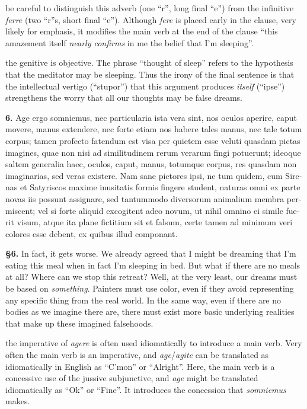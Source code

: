 be careful to distinguish this adverb (one ``r'', long final ``e'') from the infinitive \textit{ferre} (two ``r''s, short final ``e''). Although \textit{fere} is placed early in the clause, very likely for emphasis, it modifies the main verb at the end of the clause ``this amazement itself \textit{nearly confirms} in me the belief that I'm sleeping''.

 the genitive is objective. The phrase ``thought of sleep'' refers to the hypothesis that the meditator may be sleeping. Thus the irony of the final sentence is that the intellectual vertigo (``stupor'') that this argument produces \textit{itself} (``ipse'') strengthens the worry that all our thoughts may be false dreams.

\clearpage

\beginnumbering
\pstart
\begin{latin}
\textenglish{\textbf{6.}} Age ergo somniemus, nec particularia ista vera sint, nos oculos aperire, caput movere, manus extendere, nec forte etiam nos habere tales manus, nec tale totum corpus; tamen profecto fatendum est visa per quietem esse veluti quasdam pictas imagines, quae non nisi ad similitudinem rerum verarum fingi potuerunt; ideoque saltem generalia haec, oculos, caput, manus, totumque corpus, res quasdam non imaginarias, sed veras existere. Nam sane pictores ipsi, ne tum quidem, cum Sirenas et Satyriscos maxime inusitatis formis fingere student, naturas omni ex parte novas iis possunt assignare, sed tantummodo diversorum animalium membra permiscent; vel si forte aliquid excogitent adeo novum, ut nihil omnino ei simile fuerit visum, atque ita plane fictitium sit et falsum, certe tamen ad minimum veri colores esse debent, ex quibus illud componant.
\end{latin}
\pend
\endnumbering

\prenotes

\textbf{§6.} In fact, it gets worse. We already agreed that I might be dreaming that I'm eating this meal when in fact I'm sleeping in bed. But what if there are no meals at all? Where can we stop this retreat? Well, at the very least, our dreams must be based on \textit{something}. Painters must use color, even if they avoid representing any specific thing from the real world. In the same way, even if there are no bodies as we imagine there are, there must exist more basic underlying realities that make up these imagined falsehoods.

 the imperative of \textit{agere} is often used idiomatically to introduce a main verb. Very often the main verb is an imperative, and \textit{age}/\textit{agite} can be translated as idiomatically in English as ``C'mon'' or   ``Alright''. Here, the main verb is a concessive use of the jussive subjunctive, and \textit{age} might be translated idiomatically as ``Ok'' or ``Fine''. It introduces the concession that \textit{somniemus} makes.

